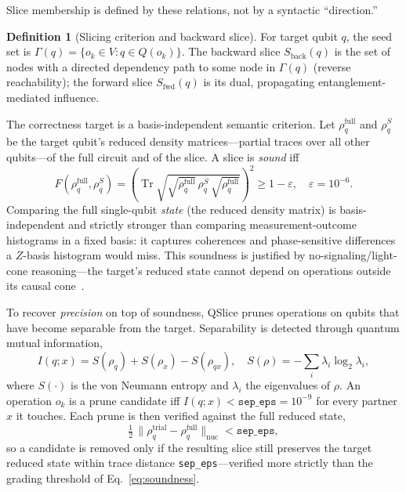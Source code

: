 \documentclass[10pt,conference]{IEEEtran}
\theoremstyle{definition}
\newtheorem{definition}{Definition}
\begin{document}
Slice membership is defined by these relations, not by a syntactic ``direction.''

\begin{definition}[Slicing criterion and backward slice]
For target qubit $q$, the seed set is $\Gamma(q)=\{o_k\in V: q\in Q(o_k)\}$. The backward slice $S_{\mathrm{back}}(q)$ is the set of nodes with a directed dependency path to some node in $\Gamma(q)$ (reverse reachability); the forward slice $S_{\mathrm{fwd}}(q)$ is its dual, propagating entanglement-mediated influence.
\end{definition}

The correctness target is a basis-independent semantic criterion. Let $\rho_q^{\mathrm{full}}$ and $\rho_q^{S}$ be the target qubit's reduced density matrices---partial traces over all other qubits---of the full circuit and of the slice. A slice is \emph{sound} iff
\begin{equation}
F\!\left(\rho_q^{\mathrm{full}},\rho_q^{S}\right)
= \left(\operatorname{Tr}\sqrt{\sqrt{\rho_q^{\mathrm{full}}}\,\rho_q^{S}\,\sqrt{\rho_q^{\mathrm{full}}}}\right)^{2}
\ge 1-\varepsilon,\quad \varepsilon=10^{-6}.
\label{eq:soundness}
\end{equation}
Comparing the full single-qubit \emph{state} (the reduced density matrix) is basis-independent and strictly stronger than comparing measurement-outcome histograms in a fixed basis: it captures coherences and phase-sensitive differences a $Z$-basis histogram would miss. This soundness is justified by no-signaling/light-cone reasoning---the target's reduced state cannot depend on operations outside its causal cone~\cite{nielsen2010quantum, horodecki2009entanglement}.

To recover \emph{precision} on top of soundness, QSlice prunes operations on qubits that have become separable from the target. Separability is detected through quantum mutual information,
\begin{equation}
I(q;x)=S(\rho_q)+S(\rho_x)-S(\rho_{qx}),\quad S(\rho)=-\sum_i \lambda_i \log_2 \lambda_i,
\label{eq:mi}
\end{equation}
where $S(\cdot)$ is the von Neumann entropy and $\lambda_i$ the eigenvalues of $\rho$. An operation $o_k$ is a prune candidate iff $I(q;x)<\texttt{sep\_eps}=10^{-9}$ for every partner $x$ it touches. Each prune is then verified against the full reduced state,
\begin{equation}
\tfrac{1}{2}\,\bigl\lVert \rho_q^{\mathrm{trial}}-\rho_q^{\mathrm{full}}\bigr\rVert_{\mathrm{nuc}} < \texttt{sep\_eps},
\label{eq:prune}
\end{equation}
so a candidate is removed only if the resulting slice still preserves the target reduced state within trace distance \texttt{sep\_eps}---verified more strictly than the grading threshold of Eq.~\eqref{eq:soundness}.
\end{document}

